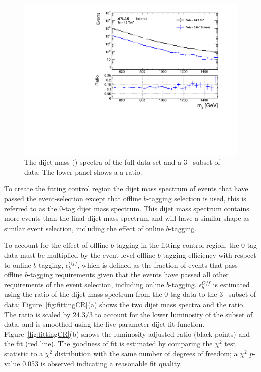 \begin{figure}[!htb]
\captionsetup[subfigure]{aboveskip=0pt,justification=centering}
\centering
\includegraphics[width=0.7\linewidth, angle=0]{figs/Dibjet/LowMass/FitStudy/subset_dataComp.pdf}
\caption{\label{fig:fittingDataSubset}
  The dijet mass (\mjj{}) spectra of the full \lm{} data-set and a 3~\ifb{} subset of \lm{} data.
  The lower panel shows a a ratio.}
\end{figure}

To create the \lm{} fitting control region
the dijet mass spectrum of events that have passed the
\lm{} event-selection except that offline $b$-tagging selection is used,
this is referred to as the 0-tag dijet mass spectrum.
This dijet mass spectrum contains more events than the final dijet mass spectrum
and will have a similar shape as similar event selection, including the effect of online $b$-tagging.

To account for the effect of offline $b$-tagging in the fitting control region,
the 0-tag data must be multiplied by the event-level offline $b$-tagging efficiency with respect to online $b$-tagging, $\epsilon_b^{Off}$,
which is defined as the fraction of events that pass offline $b$-tagging requirements given
that the events have passed all other requirements of the \lm{} event selection, including online $b$-tagging.
$\epsilon_b^{Off}$ is estimated using the ratio
of the dijet mass spectrum from the 0-tag data to the 3~\ifb{} subset of data;
Figure~\ref{fig:fittingCR}(a) shows the two dijet mass spectra and the ratio.
The ratio is scaled by 24.3/3 to account for the lower luminosity of the subset of data,
and is smoothed using the five parameter dijet fit function.
Figure~\ref{fig:fittingCR}(b) shows the luminosity adjusted ratio (black points) and the fit (red line).
The goodness of fit is estimated by comparing the $\chi^2$ test statistic to a $\chi^2$ distribution with the same number of degrees of freedom;
a $\chi^2$ $p$-value 0.053 is observed indicating a reasonable fit quality.

